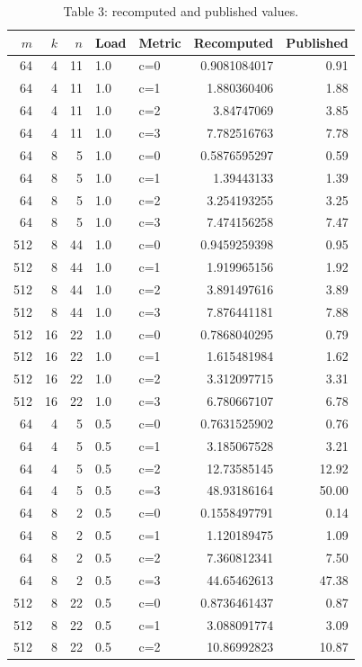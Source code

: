 \begin{longtable}{rrrllrr}
\caption{Table 3: recomputed and published values.}\\
$m$ & $k$ & $n$ & Load & Metric & Recomputed & Published \\
\hline
64 & 4 & 11 & 1.0 & c=0 & 0.9081084017 & 0.91 \\
64 & 4 & 11 & 1.0 & c=1 & 1.880360406 & 1.88 \\
64 & 4 & 11 & 1.0 & c=2 & 3.84747069 & 3.85 \\
64 & 4 & 11 & 1.0 & c=3 & 7.782516763 & 7.78 \\
64 & 8 & 5 & 1.0 & c=0 & 0.5876595297 & 0.59 \\
64 & 8 & 5 & 1.0 & c=1 & 1.39443133 & 1.39 \\
64 & 8 & 5 & 1.0 & c=2 & 3.254193255 & 3.25 \\
64 & 8 & 5 & 1.0 & c=3 & 7.474156258 & 7.47 \\
512 & 8 & 44 & 1.0 & c=0 & 0.9459259398 & 0.95 \\
512 & 8 & 44 & 1.0 & c=1 & 1.919965156 & 1.92 \\
512 & 8 & 44 & 1.0 & c=2 & 3.891497616 & 3.89 \\
512 & 8 & 44 & 1.0 & c=3 & 7.876441181 & 7.88 \\
512 & 16 & 22 & 1.0 & c=0 & 0.7868040295 & 0.79 \\
512 & 16 & 22 & 1.0 & c=1 & 1.615481984 & 1.62 \\
512 & 16 & 22 & 1.0 & c=2 & 3.312097715 & 3.31 \\
512 & 16 & 22 & 1.0 & c=3 & 6.780667107 & 6.78 \\
64 & 4 & 5 & 0.5 & c=0 & 0.7631525902 & 0.76 \\
64 & 4 & 5 & 0.5 & c=1 & 3.185067528 & 3.21 \\
64 & 4 & 5 & 0.5 & c=2 & 12.73585145 & 12.92 \\
64 & 4 & 5 & 0.5 & c=3 & 48.93186164 & 50.00 \\
64 & 8 & 2 & 0.5 & c=0 & 0.1558497791 & 0.14 \\
64 & 8 & 2 & 0.5 & c=1 & 1.120189475 & 1.09 \\
64 & 8 & 2 & 0.5 & c=2 & 7.360812341 & 7.50 \\
64 & 8 & 2 & 0.5 & c=3 & 44.65462613 & 47.38 \\
512 & 8 & 22 & 0.5 & c=0 & 0.8736461437 & 0.87 \\
512 & 8 & 22 & 0.5 & c=1 & 3.088091774 & 3.09 \\
512 & 8 & 22 & 0.5 & c=2 & 10.86992823 & 10.87 \\

\end{longtable}
